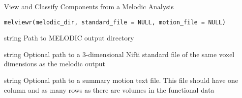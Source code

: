 \documentclass[a4paper]{book}
\begin{document}
%
\begin{Description}\relax
View and Classify Components from a Melodic Analysis
\end{Description}
%
\begin{Usage}
\begin{verbatim}
melviewr(melodic_dir, standard_file = NULL, motion_file = NULL)
\end{verbatim}
\end{Usage}
%
\begin{Arguments}
\begin{ldescription}
\item[\code{melodic\_dir}] string Path to MELODIC output directory

\item[\code{standard\_file}] string Optional path to a 3-dimensional Nifti standard file
of the same voxel dimensions as the melodic output

\item[\code{motion\_file}] string Optional path to a summary motion text file. This file
should have one column and as many rows as there are volumes in the functional
data
\end{ldescription}
\end{Arguments}
\printindex{}
\end{document}
